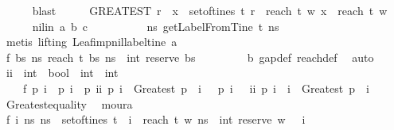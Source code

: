 \begin{isabellebody}
\ \ \ \ \isamarkupfalse%
\ blast\isanewline
\ \ \isamarkupfalse%
\ \isamarkupfalse%
\ {\isachardoublequoteopen}{\isacharparenleft}GREATEST\ r{\isachardot}\ {\isasymexists}\ x\ {\isasymin}\ set{\isacharunderscore}of{\isacharunderscore}tines\ t{\isachardot}\ r\ {\isacharequal}\ reach\ t\ w\ x{\isacharparenright}\ {\isasymge}\ reach\ t\ w\ {\isacharbrackleft}{\isacharbrackright}{\isachardoublequoteclose}\ \isanewline
\ \ \ \ \isamarkupfalse%
\ nilin\ a\ b\ c\isanewline
\ \ \isamarkupfalse%
\ {\isacharminus}\isanewline
\ \ \ \ \isamarkupfalse%
\ {\isachardoublequoteopen}{\isasymAnd}ns{\isachardot}\ getLabelFromTine\ t\ ns\ {\isacharequal}\ {\isacharbrackleft}{\isacharbrackright}{\isachardoublequoteclose}\isanewline
\ \ \ \ \ \ \isamarkupfalse%
\ {\isacharparenleft}metis\ {\isacharparenleft}lifting{\isacharparenright}\ Leaf{\isacharunderscore}imp{\isacharunderscore}nil{\isacharunderscore}label{\isacharunderscore}tine\ a{\isacharparenright}\isanewline
\ \ \ \ \isamarkupfalse%
\ \isamarkupfalse%
\ f{}{\isacharcolon}\ {\isachardoublequoteopen}{\isasymAnd}bs\ ns{\isachardot}\ reach\ t\ bs\ ns\ {\isacharequal}\ int\ {\isacharparenleft}reserve\ bs\ {\isacharbrackleft}{\isacharbrackright}{\isacharparenright}{\isachardoublequoteclose}\isanewline
\ \ \ \ \ \ \isamarkupfalse%
\ b\ gap{\isacharunderscore}def\ reach{\isacharunderscore}def\ \isamarkupfalse%
\ auto\isanewline
\ \ \isamarkupfalse%
\ ii\ {\isacharcolon}{\isacharcolon}\ {\isachardoublequoteopen}{\isacharparenleft}int\ {\isasymRightarrow}\ bool{\isacharparenright}\ {\isasymRightarrow}\ int\ {\isasymRightarrow}\ int{\isachardoublequoteclose}\ \isanewline
\ \ \ \ f{}{\isacharcolon}\ {\isachardoublequoteopen}{\isasymAnd}p\ i{\isachardot}\ {\isacharparenleft}{\isasymnot}\ p\ i\ {\isasymor}\ p\ {\isacharparenleft}ii\ p\ i{\isacharparenright}\ {\isasymor}\ Greatest\ p\ {\isacharequal}\ i{\isacharparenright}\ {\isasymand}\ {\isacharparenleft}{\isasymnot}\ p\ i\ {\isasymor}\ {\isasymnot}\ ii\ p\ i\ {\isasymle}\ i\ {\isasymor}\ Greatest\ p\ {\isacharequal}\ i{\isacharparenright}{\isachardoublequoteclose}\isanewline
\ \ \ \ \isamarkupfalse%
\ Greatest{\isacharunderscore}equality\ \isamarkupfalse%
\ moura\isanewline
\ \ \isamarkupfalse%
\ f{}{\isacharcolon}\ {\isachardoublequoteopen}{\isasymAnd}i{\isachardot}\ {\isacharparenleft}{\isasymforall}ns{\isachardot}\ ns\ {\isasymnotin}\ set{\isacharunderscore}of{\isacharunderscore}tines\ t\ {\isasymor}\ i\ {\isasymnoteq}\ reach\ t\ w\ ns{\isacharparenright}\ {\isasymor}\ int\ {\isacharparenleft}reserve\ w\ {\isacharbrackleft}{\isacharbrackright}{\isacharparenright}\ {\isacharequal}\ i{\isachardoublequoteclose}\isanewline

\end{isabellebody}
